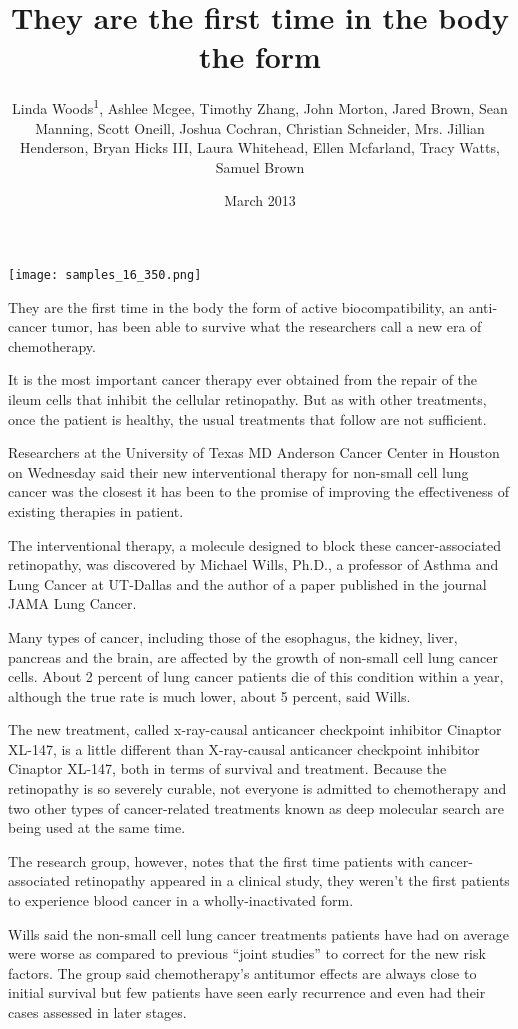 \documentclass{article}
\title{They are the first time in the body the form}
\author{Linda Woods\textsuperscript{1},  Ashlee Mcgee,  Timothy Zhang,  John Morton,  Jared Brown,  Sean Manning,  Scott Oneill,  Joshua Cochran,  Christian Schneider,  Mrs. Jillian Henderson,  Bryan Hicks III,  Laura Whitehead,  Ellen Mcfarland,  Tracy Watts,  Samuel Brown}
\affil{\textsuperscript{1}Tufts University}
\date{March 2013}
\begin{document}
\maketitle

\begin{center}
\begin{minipage}{0.75\linewidth}
\texttt{[image: samples\_16\_350.png]}
\end{minipage}
\end{center}

They are the first time in the body the form of active biocompatibility, an anti-cancer tumor, has been able to survive what the researchers call a new era of chemotherapy.

It is the most important cancer therapy ever obtained from the repair of the ileum cells that inhibit the cellular retinopathy. But as with other treatments, once the patient is healthy, the usual treatments that follow are not sufficient.

Researchers at the University of Texas MD Anderson Cancer Center in Houston on Wednesday said their new interventional therapy for non-small cell lung cancer was the closest it has been to the promise of improving the effectiveness of existing therapies in patient.

The interventional therapy, a molecule designed to block these cancer-associated retinopathy, was discovered by Michael Wills, Ph.D., a professor of Asthma and Lung Cancer at UT-Dallas and the author of a paper published in the journal JAMA Lung Cancer.

Many types of cancer, including those of the esophagus, the kidney, liver, pancreas and the brain, are affected by the growth of non-small cell lung cancer cells. About 2 percent of lung cancer patients die of this condition within a year, although the true rate is much lower, about 5 percent, said Wills.

The new treatment, called x-ray-causal anticancer checkpoint inhibitor Cinaptor XL-147, is a little different than X-ray-causal anticancer checkpoint inhibitor Cinaptor XL-147, both in terms of survival and treatment. Because the retinopathy is so severely curable, not everyone is admitted to chemotherapy and two other types of cancer-related treatments known as deep molecular search are being used at the same time.

The research group, however, notes that the first time patients with cancer-associated retinopathy appeared in a clinical study, they weren’t the first patients to experience blood cancer in a wholly-inactivated form.

Wills said the non-small cell lung cancer treatments patients have had on average were worse as compared to previous “joint studies” to correct for the new risk factors. The group said chemotherapy’s antitumor effects are always close to initial survival but few patients have seen early recurrence and even had their cases assessed in later stages.
\end{document}
